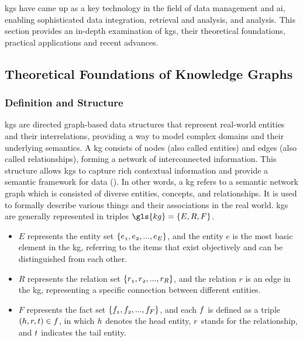\glspl{kg} have came up as a key technology in the field of data management and \gls{ai}, enabling sophisticated data integration, retrieval and analysis, and analysis.
This section provides an in-depth examination of \glspl{kg}, their theoretical foundations, practical applications and recent advances.

\subsection*{Theoretical Foundations of Knowledge Graphs}
\subsubsection*{Definition and Structure}
\glspl{kg} are directed graph-based data structures that represent real-world entities and their interrelations, providing a way to model complex domains and their underlying semantics.
A \gls{kg} consists of nodes (also called entities) and edges (also called relationships), forming a network of interconnected information.
This structure allows \glspl{kg} to capture rich contextual information and provide a semantic framework for data (\cite{Hogan2021}).
In other words, a \gls{kg} refers to a semantic network graph which is consisted of diverse entities, concepts, and relationships.
It is used to formally describe various things and their associations in the real world.
\glspl{kg} are generally represented in triples $\gls{kg}=\{\mathnormal{E,R,F}\}$.
\begin{itemize}
    \item $E$ represents the entity set $\{\mathnormal{e_1, e_2, ... ,e_E} \}$, and the entity $e$ is the most basic element in the \gls{kg}, referring to the items that exist objectively and can be distinguished from each other.
    \item $R$ represents the relation set $\{\mathnormal{r_1, r_2, ... ,r_R}\}$, and the relation $r$ is an edge in the \gls{kg}, representing a specific connection between different entities.
    \item $F$ represents the fact set $\{\mathnormal{f_1,f_2, ... ,f_F}\}$, and each $\mathnormal{f}$ is defined as a triple $(\mathnormal{h,r,t}) \in \mathnormal{f}$, in which $\mathnormal{h}$ denotes the head entity, $\mathnormal{r}$ stands for the relationship, and $\mathnormal{t}$ indicates the tail entity.
\end{itemize}


